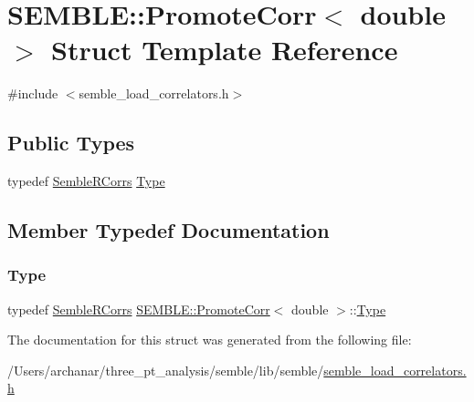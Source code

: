 \hypertarget{structSEMBLE_1_1PromoteCorr_3_01double_01_4}{}\section{S\+E\+M\+B\+LE\+:\+:Promote\+Corr$<$ double $>$ Struct Template Reference}
\label{structSEMBLE_1_1PromoteCorr_3_01double_01_4}


{\ttfamily \#include $<$semble\+\_\+load\+\_\+correlators.\+h$>$}

\subsection*{Public Types}
\begin{DoxyCompactItemize}
\item 
typedef \mbox{\hyperlink{classSEMBLE_1_1SembleRCorrs}{Semble\+R\+Corrs}} \mbox{\hyperlink{structSEMBLE_1_1PromoteCorr_3_01double_01_4_a050cf005af0232357cbbf16fa540977a}{Type}}
\end{DoxyCompactItemize}


\subsection{Member Typedef Documentation}
\mbox{\label{structSEMBLE_1_1PromoteCorr_3_01double_01_4_a050cf005af0232357cbbf16fa540977a}} 
\subsubsection{\texorpdfstring{Type}{Type}}
{\footnotesize\ttfamily typedef \mbox{\hyperlink{classSEMBLE_1_1SembleRCorrs}{Semble\+R\+Corrs}} \mbox{\hyperlink{structSEMBLE_1_1PromoteCorr}{S\+E\+M\+B\+L\+E\+::\+Promote\+Corr}}$<$ double $>$\+::\mbox{\hyperlink{structSEMBLE_1_1PromoteCorr_3_01double_01_4_a050cf005af0232357cbbf16fa540977a}{Type}}}



The documentation for this struct was generated from the following file\+:\begin{DoxyCompactItemize}
\item 
/\+Users/archanar/three\+\_\+pt\+\_\+analysis/semble/lib/semble/\mbox{\hyperlink{semble__load__correlators_8h}{semble\+\_\+load\+\_\+correlators.\+h}}\end{DoxyCompactItemize}
